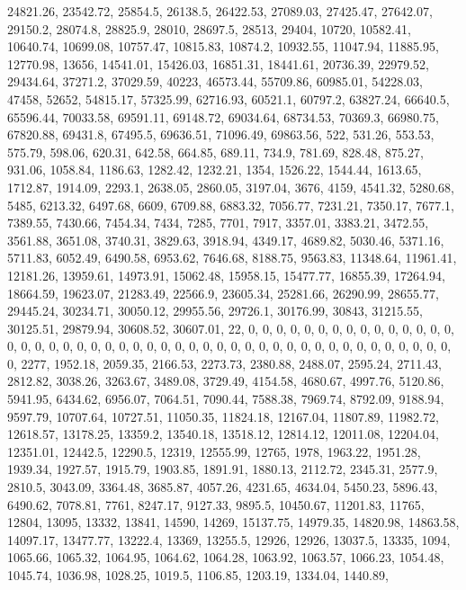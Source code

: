 \documentclass[
]{article}
\begin{document}
24821.26, 23542.72, 25854.5, 26138.5, 26422.53, 27089.03, 27425.47,
27642.07, 29150.2, 28074.8, 28825.9, 28010, 28697.5, 28513, 29404,
10720, 10582.41, 10640.74, 10699.08, 10757.47, 10815.83, 10874.2,
10932.55, 11047.94, 11885.95, 12770.98, 13656, 14541.01, 15426.03,
16851.31, 18441.61, 20736.39, 22979.52, 29434.64, 37271.2, 37029.59,
40223, 46573.44, 55709.86, 60985.01, 54228.03, 47458, 52652, 54815.17,
57325.99, 62716.93, 60521.1, 60797.2, 63827.24, 66640.5, 65596.44,
70033.58, 69591.11, 69148.72, 69034.64, 68734.53, 70369.3, 66980.75,
67820.88, 69431.8, 67495.5, 69636.51, 71096.49, 69863.56, 522, 531.26,
553.53, 575.79, 598.06, 620.31, 642.58, 664.85, 689.11, 734.9, 781.69,
828.48, 875.27, 931.06, 1058.84, 1186.63, 1282.42, 1232.21, 1354,
1526.22, 1544.44, 1613.65, 1712.87, 1914.09, 2293.1, 2638.05, 2860.05,
3197.04, 3676, 4159, 4541.32, 5280.68, 5485, 6213.32, 6497.68, 6609,
6709.88, 6883.32, 7056.77, 7231.21, 7350.17, 7677.1, 7389.55, 7430.66,
7454.34, 7434, 7285, 7701, 7917, 3357.01, 3383.21, 3472.55, 3561.88,
3651.08, 3740.31, 3829.63, 3918.94, 4349.17, 4689.82, 5030.46, 5371.16,
5711.83, 6052.49, 6490.58, 6953.62, 7646.68, 8188.75, 9563.83, 11348.64,
11961.41, 12181.26, 13959.61, 14973.91, 15062.48, 15958.15, 15477.77,
16855.39, 17264.94, 18664.59, 19623.07, 21283.49, 22566.9, 23605.34,
25281.66, 26290.99, 28655.77, 29445.24, 30234.71, 30050.12, 29955.56,
29726.1, 30176.99, 30843, 31215.55, 30125.51, 29879.94, 30608.52,
30607.01, 22, 0, 0, 0, 0, 0, 0, 0, 0, 0, 0, 0, 0, 0, 0, 0, 0, 0, 0, 0,
0, 0, 0, 0, 0, 0, 0, 0, 0, 0, 0, 0, 0, 0, 0, 0, 0, 0, 0, 0, 0, 0, 0, 0,
0, 0, 0, 0, 0, 2277, 1952.18, 2059.35, 2166.53, 2273.73, 2380.88,
2488.07, 2595.24, 2711.43, 2812.82, 3038.26, 3263.67, 3489.08, 3729.49,
4154.58, 4680.67, 4997.76, 5120.86, 5941.95, 6434.62, 6956.07, 7064.51,
7090.44, 7588.38, 7969.74, 8792.09, 9188.94, 9597.79, 10707.64,
10727.51, 11050.35, 11824.18, 12167.04, 11807.89, 11982.72, 12618.57,
13178.25, 13359.2, 13540.18, 13518.12, 12814.12, 12011.08, 12204.04,
12351.01, 12442.5, 12290.5, 12319, 12555.99, 12765, 1978, 1963.22,
1951.28, 1939.34, 1927.57, 1915.79, 1903.85, 1891.91, 1880.13, 2112.72,
2345.31, 2577.9, 2810.5, 3043.09, 3364.48, 3685.87, 4057.26, 4231.65,
4634.04, 5450.23, 5896.43, 6490.62, 7078.81, 7761, 8247.17, 9127.33,
9895.5, 10450.67, 11201.83, 11765, 12804, 13095, 13332, 13841, 14590,
14269, 15137.75, 14979.35, 14820.98, 14863.58, 14097.17, 13477.77,
13222.4, 13369, 13255.5, 12926, 12926, 13037.5, 13335, 1094, 1065.66,
1065.32, 1064.95, 1064.62, 1064.28, 1063.92, 1063.57, 1066.23, 1054.48,
1045.74, 1036.98, 1028.25, 1019.5, 1106.85, 1203.19, 1334.04, 1440.89,
\end{document}
